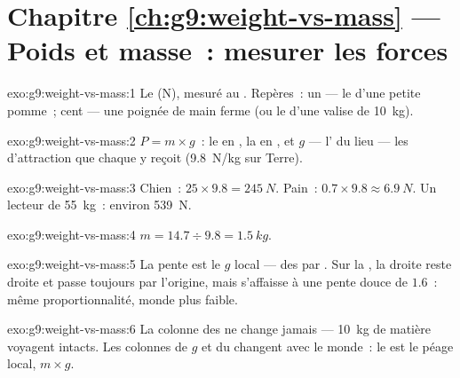 \section*{Chapitre \ref{ch:g9:weight-vs-mass} --- Poids et masse~: mesurer les forces}

\begin{solution}{exo:g9:weight-vs-mass:1}
Le  (\unit{N}), mesuré au . Repères~: un  ---
le  d'une petite pomme~; cent  --- une poignée de main
ferme (ou le  d'une valise de \qty{10}{kg}).
\end{solution}

\begin{solution}{exo:g9:weight-vs-mass:2}
$P = m \times g$~: le  en , la  en , et
$g$ --- l' du lieu --- les 
d'attraction que chaque  y reçoit (\qty{9.8}{N/kg} sur
Terre).
\end{solution}

\begin{solution}{exo:g9:weight-vs-mass:3}
Chien~: $25 \times 9.8 = \qty{245}{N}$. Pain~:
$0.7 \times 9.8 \approx \qty{6.9}{N}$. Un lecteur de \qty{55}{kg}~:
environ \qty{539}{N}.
\end{solution}

\begin{solution}{exo:g9:weight-vs-mass:4}
$m = 14.7 \div 9.8 = \qty{1.5}{kg}$.
\end{solution}

\begin{solution}{exo:g9:weight-vs-mass:5}
La pente est le $g$ local --- des  par . Sur la ,
la droite reste droite et passe toujours par l'origine, mais
s'affaisse à une pente douce de $1.6$~: même proportionnalité, monde
plus faible.
\end{solution}

\begin{solution}{exo:g9:weight-vs-mass:6}
La colonne des  ne change jamais --- \qty{10}{kg} de matière
voyagent intacts. Les colonnes de $g$ et du  changent avec le
monde~: le  est le péage local, $m \times g$.
\end{solution}


